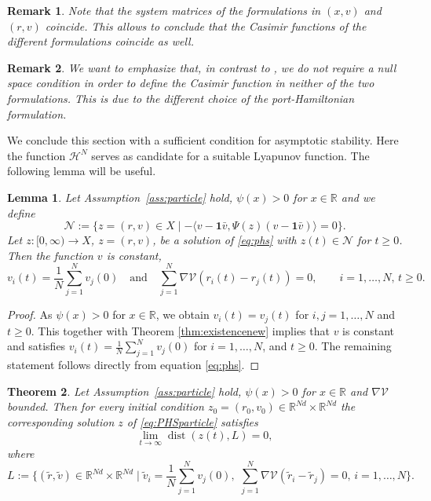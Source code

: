 \documentclass[11pt]{article}
\newtheorem{theorem}{Theorem}[section]
\newtheorem{lemma}[theorem]{Lemma}
\newtheorem*{remark}{Remark}
\newcommand{\R}[0]{\mathbb R}
\newcommand{\sumj}[0]{\sum_{j=1}^N}
\DeclareMathOperator{\dist}{dist}
\begin{document}
\begin{bibunit}[abbrv]
\begin{remark}
Note that the system matrices of the formulations in $(x,v)$ and $(r,v)$ coincide. This allows to conclude that the Casimir functions of the different formulations coincide as well.
\end{remark}

\begin{remark}
We want to emphasize that, in contrast to \cite{Matei}, we do not require a null space condition in order to define the Casimir function in neither of the two formulations. This is due to the different choice of the port-Hamiltonian formulation.
\end{remark}


We conclude this section with a sufficient condition for asymptotic stability. Here the function $\mathcal H^N$ serves as candidate for a suitable Lyapunov function. The following lemma will be useful.

\begin{lemma}\label{lem:invariantnew}
Let Assumption~\ref{ass:particle} hold, $\psi(x)>0$  for $x\in\R$ and we define 
 \[ \mathcal N:= \{z=(r,v)\in X\mid  - \langle v - \mathbf{1}\bar v, \Psi(z)( v - \mathbf{1}\bar v )\rangle = 0\}. \]
 Let $z:[0,\infty)\rightarrow X$, $z=(r,v)$, be a solution of \eqref{eq:phs} with $z(t)\in \mathcal N$ for $t\ge 0$. Then the function $v$ is constant,
 \[  v_i(t)=\frac{1}{N}\sumj v_j(0)\quad\text{and}\quad \sumj \nabla \mathcal V(r_ i(t) - r_j(t))=0, \qquad i=1,\ldots, N, \, t\ge 0.\]
\end{lemma}
\begin{proof}
 As $\psi(x)>0$  for $x\in\R$,  we obtain $ v_i(t)=v_j(t)$ for  $i,j=1, \ldots, N$ and $t\ge 0$. This together with Theorem \ref{thm:existencenew} implies that $v$ is constant and satisfies $v_i(t)=\frac{1}{N}\sumj v_j(0)$ for $ i=1,\ldots, N$, and $t\ge 0$. The remaining statement follows directly from equation \eqref{eq:phs}. 
\end{proof}


\begin{theorem}\label{prop:stabil}
Let Assumption~\ref{ass:particle} hold, $\psi(x)>0$  for $x\in\R$ and $\nabla \mathcal V$ bounded.
Then  for every initial condition $ z_0=(r_0,v_0)\in \R^{Nd}\times \R^{Nd}$ the corresponding solution $z$ of \eqref{eq:PHSparticle} satisfies
\[ \lim_{t\rightarrow \infty} \dist(z(t), L) =0, \]
where 
\[ L:= \Big\{ (\tilde r,\tilde v)\in \R^{Nd}\times \R^{Nd}\mid \tilde v_i=\frac{1}{N}\sumj v_j(0),\,\, \sumj \nabla \mathcal V(\tilde r_ i - \tilde r_j)=0, \, i=1,\ldots, N\Big\}. \]
\end{theorem}


\end{bibunit}
\end{document}
